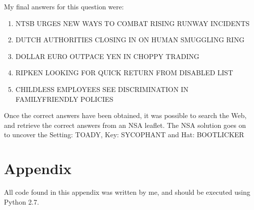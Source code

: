 \documentclass[11pt,a4paper,twoside]{article}
\begin{document}
My final answers for this question were: 

\begin{enumerate}[noitemsep]
\item NTSB URGES NEW WAYS TO COMBAT RISING RUNWAY INCIDENTS
\item DUTCH AUTHORITIES CLOSING IN ON HUMAN SMUGGLING RING
\item DOLLAR EURO OUTPACE YEN IN CHOPPY TRADING
\item RIPKEN LOOKING FOR QUICK RETURN FROM DISABLED LIST
\item CHILDLESS EMPLOYEES SEE DISCRIMINATION IN FAMILYFRIENDLY POLICIES
\end{enumerate}

Once the correct answers have been obtained, it was possible to search the Web,
and retrieve the correct answers from an NSA leaflet. The NSA solution goes on
to uncover the Setting: TOADY, Key: SYCOPHANT and Hat: BOOTLICKER


%
%
%

\vfill
\pagebreak
\section*{Appendix} 
\appendix 

All code found in this appendix was written by me, and should be executed using
Python 2.7. 
\end{document}
